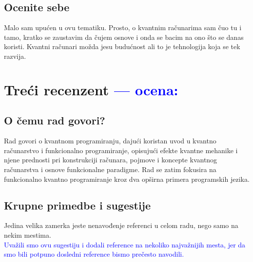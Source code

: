 \documentclass[a4paper]{report}
\newcommand{\odgovor}[1]{\textcolor{blue}{#1}}
\begin{document}
\section{Ocenite sebe}

Malo sam upućen u ovu tematiku. Prosto, o kvantnim računarima sam čuo tu i tamo, 
kratko se zaustavim da čujem osnove i onda se bacim na ono što se danas koristi. 
Kvantni računari možda jesu budućnost ali to je tehnologija koja se tek razvija. 



\chapter{Treći recenzent \odgovor{--- ocena:} }

\section{O čemu rad govori?}
Rad govori o kvantnom programiranju, dajući koristan uvod u kvantno računarstvo i funkcionalno programiranje, opisujući efekte kvantne mehanike i njene prednosti pri konstrukciji računara, pojmove i koncepte kvantnog računarstva i osnove funkcionalne paradigme. Rad se zatim fokusira na funkcionalno kvantno programiranje kroz dva opširna primera programskih jezika.

\section{Krupne primedbe i sugestije}
Jedina velika zamerka jeste nenavođenje referenci u celom radu, nego samo na nekim mestima. \\
\odgovor { Uvažili smo ovu sugestiju i dodali reference na nekoliko najvažnijih mesta, jer da smo bili potpuno dosledni reference bismo prečesto navodili. }

\end{document}
